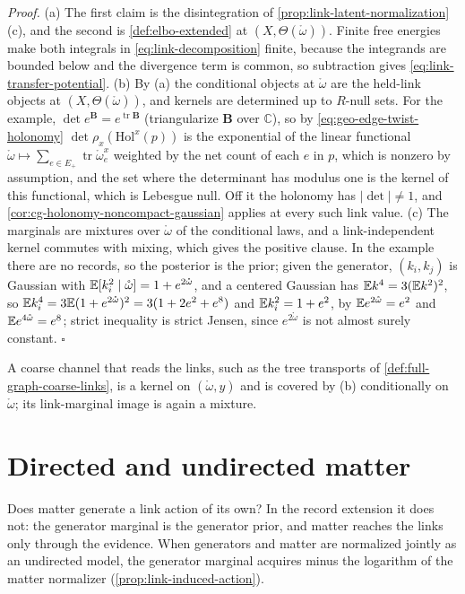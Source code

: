 \noindent\emph{Proof.}
(a) The first claim is the disintegration of \cref{prop:link-latent-normalization}(c), and the second is
\cref{def:elbo-extended} at $(X,\Theta(\mathring\omega))$. Finite free energies make both integrals in
\eqref{eq:link-decomposition} finite, because the integrands are bounded below and the divergence term is
common, so subtraction gives \eqref{eq:link-transfer-potential}. (b) By (a) the conditional objects at
$\mathring\omega$ are the held-link objects at $(X,\Theta(\mathring\omega))$, and kernels are determined up to
$R$-null sets. For the example, $\det e^{\mathbf B}=e^{\operatorname{tr}\mathbf B}$ (triangularize $\mathbf B$ over
$\mathbb C$), so by \eqref{eq:geo-edge-twist-holonomy}
$\det\rho_x(\mathrm{Hol}^x(p))$ is the exponential of the linear functional
$\mathring\omega\mapsto\sum_{e\in E_+}\operatorname{tr}\mathring\omega^x_e$ weighted by the net count of each $e$ in $p$, which is
nonzero by assumption, and the set where the determinant has modulus one is the kernel of this functional,
which is Lebesgue null. Off it the holonomy has $\lvert\det\rvert\neq1$, and
\cref{cor:cg-holonomy-noncompact-gaussian} applies at every such link value. (c) The marginals are mixtures
over $\mathring\omega$ of the conditional laws, and a link-independent kernel commutes with mixing, which gives
the positive clause. In the example there are no records, so the posterior is the prior; given the
generator, $(k_i,k_j)$ is Gaussian with $\mathbb E[k_i^2\mid\mathring\omega]=1+e^{2\mathring\omega}$, and a centered Gaussian
has $\mathbb E k^4=3(\mathbb E k^2)^2$, so $\mathbb E k_i^4=3\mathbb E(1+e^{2\mathring\omega})^2=3(1+2e^2+e^8)$ and $\mathbb E k_i^2=1+e^2$, by
$\mathbb E e^{2\mathring\omega}=e^2$ and $\mathbb E e^{4\mathring\omega}=e^8$; strict inequality is strict Jensen, since
$e^{2\mathring\omega}$ is not almost surely constant. \hfill$\square$

A coarse channel that reads the links, such as the tree transports of
\cref{def:full-graph-coarse-links}, is a kernel on $(\mathring\omega,y)$ and is covered by (b) conditionally on
$\mathring\omega$; its link-marginal image is again a mixture.

\section{Directed and undirected matter}
\label{sec:link-induced}

Does matter generate a link action of its own? In the record extension it does not: the generator marginal
is the generator prior, and matter reaches the links only through the evidence. When generators and matter
are normalized jointly as an undirected model, the generator marginal acquires minus the logarithm of the
matter normalizer (\cref{prop:link-induced-action}).

